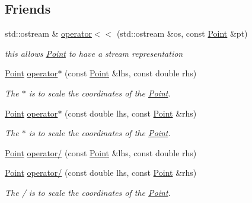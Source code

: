 \subsection*{Friends}
\begin{DoxyCompactItemize}
\item 
std\+::ostream \& \mbox{\hyperlink{class_jinks_draw_1_1_point_a40a2c347e8c84ef40c1a170ab17fec47}{operator$<$$<$}} (std\+::ostream \&os, const \mbox{\hyperlink{class_jinks_draw_1_1_point}{Point}} \&pt)
\begin{DoxyCompactList}\small\item\em this allows \mbox{\hyperlink{class_jinks_draw_1_1_point}{Point}} to have a stream representation \end{DoxyCompactList}\item 
\mbox{\hyperlink{class_jinks_draw_1_1_point}{Point}} \mbox{\hyperlink{class_jinks_draw_1_1_point_a9337a82e2ef8fa00c685b1ea4e6beab4}{operator$\ast$}} (const \mbox{\hyperlink{class_jinks_draw_1_1_point}{Point}} \&lhs, const double rhs)
\begin{DoxyCompactList}\small\item\em The $\ast$ is to scale the coordinates of the \mbox{\hyperlink{class_jinks_draw_1_1_point}{Point}}. \end{DoxyCompactList}\item 
\mbox{\hyperlink{class_jinks_draw_1_1_point}{Point}} \mbox{\hyperlink{class_jinks_draw_1_1_point_a143408ed7b4a531fc9c50620a27076b7}{operator$\ast$}} (const double lhs, const \mbox{\hyperlink{class_jinks_draw_1_1_point}{Point}} \&rhs)
\begin{DoxyCompactList}\small\item\em The $\ast$ is to scale the coordinates of the \mbox{\hyperlink{class_jinks_draw_1_1_point}{Point}}. \end{DoxyCompactList}\item 
\mbox{\hyperlink{class_jinks_draw_1_1_point}{Point}} \mbox{\hyperlink{class_jinks_draw_1_1_point_aa273408c569cbd473a15daf3cb65c980}{operator/}} (const \mbox{\hyperlink{class_jinks_draw_1_1_point}{Point}} \&lhs, const double rhs)
\item 
\mbox{\hyperlink{class_jinks_draw_1_1_point}{Point}} \mbox{\hyperlink{class_jinks_draw_1_1_point_ac21d6c4989dc10c09dcdc014ce43f44e}{operator/}} (const double lhs, const \mbox{\hyperlink{class_jinks_draw_1_1_point}{Point}} \&rhs)
\begin{DoxyCompactList}\small\item\em The / is to scale the coordinates of the \mbox{\hyperlink{class_jinks_draw_1_1_point}{Point}}. \end{DoxyCompactList}\item 

\end{DoxyCompactItemize}
